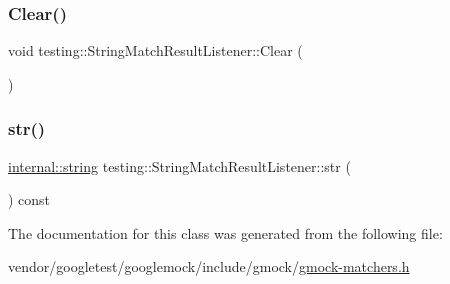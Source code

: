 \subsubsection{\texorpdfstring{Clear()}{Clear()}}
{\footnotesize\ttfamily void testing\+::\+String\+Match\+Result\+Listener\+::\+Clear (\begin{DoxyParamCaption}{ }\end{DoxyParamCaption})\hspace{0.3cm}{\ttfamily [inline]}}

\mbox{\label{classtesting_1_1_string_match_result_listener_ad1ed3c6b1077cc76b67567b33f5a2bd1}} 
\subsubsection{\texorpdfstring{str()}{str()}}
{\footnotesize\ttfamily \hyperlink{namespacetesting_1_1internal_a8e8ff5b11e64078831112677156cb111}{internal\+::string} testing\+::\+String\+Match\+Result\+Listener\+::str (\begin{DoxyParamCaption}{ }\end{DoxyParamCaption}) const\hspace{0.3cm}{\ttfamily [inline]}}



The documentation for this class was generated from the following file\+:\begin{DoxyCompactItemize}
\item 
vendor/googletest/googlemock/include/gmock/\hyperlink{gmock-matchers_8h}{gmock-\/matchers.\+h}\end{DoxyCompactItemize}
